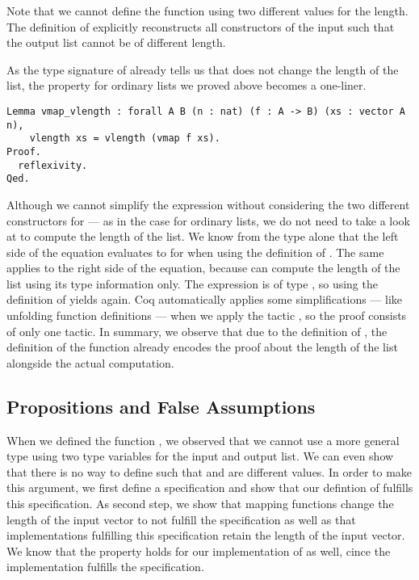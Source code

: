Note that we cannot define the function using two different values for the length.
The definition of  explicitly reconstructs all constructors of the input  such that the output list cannot be of different length.

As the type signature of  already tells us that  does not change the length of the list, the property for ordinary lists we proved above becomes a one-liner.

\begin{verbatim}
Lemma vmap_vlength : forall A B (n : nat) (f : A -> B) (xs : vector A n),
    vlength xs = vlength (vmap f xs).
Proof.
  reflexivity.
Qed.
\end{verbatim}

Although we cannot simplify the expression  without considering the two different constructors for  --- as in the case for ordinary lists, we do not need to take a look at  to compute the length of the list.
We know from the type alone that the left side of the equation evaluates to  for  when using the definition of .
The same applies to the right side of the equation, because  can compute the length of the list using its type information only.
The expression  is of type , so using the definition of  yields  again.
Coq automatically applies some simplifications --- like unfolding function definitions --- when we apply the tactic , so the proof consists of only one tactic.
In summary, we observe that due to the definition of , the definition of the function  already encodes the proof about the length of the list alongside the actual computation.

\subsection{Propositions and False Assumptions}

When we defined the function , we observed that we cannot use a more general type using two type variables  for the input and output list.
We can even show that there is no way to define  such that  and  are different values.
In order to make this argument, we first define a specification and show that our defintion of  fulfills this specification.
As second step, we show that mapping functions change the length of the input vector to not fulfill the specification as well as that implementations fulfilling this specification retain the length of the input vector.
We know that the property holds for our implementation of  as well, cince the implementation fulfills the specification.

